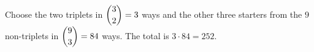 Choose the two triplets in $\dbinom32=3$ ways and the other three starters from the $9$ non-triplets in $\dbinom93=84$ ways. The total is $3\cdot84=\boxed{252}$.
